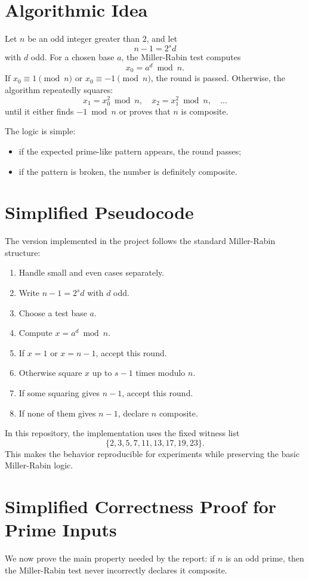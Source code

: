 \documentclass[12pt,a4paper]{report}
\begin{document}
\section{Algorithmic Idea}
Let \(n\) be an odd integer greater than \(2\), and let
\[
n - 1 = 2^s d
\]
with \(d\) odd. For a chosen base \(a\), the Miller-Rabin test computes
\[
x_0 = a^d \bmod n.
\]
If \(x_0 \equiv 1 \pmod{n}\) or \(x_0 \equiv -1 \pmod{n}\), the round is passed. Otherwise, the algorithm repeatedly squares:
\[
x_1 = x_0^2 \bmod n,\quad
x_2 = x_1^2 \bmod n,\quad \dots
\]
until it either finds \(-1 \bmod n\) or proves that \(n\) is composite.

The logic is simple:
\begin{itemize}
    \item if the expected prime-like pattern appears, the round passes;
    \item if the pattern is broken, the number is definitely composite.
\end{itemize}

\section{Simplified Pseudocode}
The version implemented in the project follows the standard Miller-Rabin structure:
\begin{enumerate}
    \item Handle small and even cases separately.
    \item Write \(n-1 = 2^s d\) with \(d\) odd.
    \item Choose a test base \(a\).
    \item Compute \(x = a^d \bmod n\).
    \item If \(x = 1\) or \(x = n-1\), accept this round.
    \item Otherwise square \(x\) up to \(s-1\) times modulo \(n\).
    \item If some squaring gives \(n-1\), accept this round.
    \item If none of them gives \(n-1\), declare \(n\) composite.
\end{enumerate}

In this repository, the implementation uses the fixed witness list
\[
\{2,3,5,7,11,13,17,19,23\}.
\]
This makes the behavior reproducible for experiments while preserving the basic Miller-Rabin logic.

\section{Simplified Correctness Proof for Prime Inputs}
We now prove the main property needed by the report: if \(n\) is an odd prime, then the Miller-Rabin test never incorrectly declares it composite.
\end{document}

